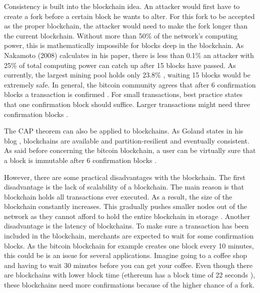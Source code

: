 
Consistency is built into the blockchain idea. An attacker would first have to create a fork before a certain block he wants to alter. For this fork to be accepted as the proper blockchain, the attacker would need to make the fork longer than the current blockchain. Without more than 50\% of the network's computing power, this is mathematically impossible for blocks deep in the blockchain. As Nakamoto (2008) calculates in his paper, there is less than 0.1\% an attacker with 25\% of total computing power can catch up after 15 blocks have passed. As currently, the largest mining pool holds only 23.8\% \cite{hashrate-distribution}, waiting 15 blocks would be extremely safe. In general, the bitcoin community agrees that after 6 confirmation blocks a transaction is confirmed \cite{bitcoin-confirmation-amount}. For small transactions, best practice states that one confirmation block should suffice. Larger transactions might need three confirmation blocks \cite{confirmation-safety}.


The CAP theorem can also be applied to blockchains. As Goland states in his blog \cite{blockchain-cap}, blockchains are available and partition-resilient and eventually consistent. As said before concerning the bitcoin blockchain, a user can be virtually sure that a block is immutable after 6 confirmation blocks \cite{bitcoin-confirmation-amount}.

However, there are some practical disadvantages with the blockchain. The first disadvantage is the lack of scalability of a blockchain. The main reason is that blockchain holds all transactions ever executed. As a result, the size of the blockchain constantly increases. This gradually pushes smaller nodes out of the network as they cannot afford to hold the entire blockchain in storage \cite{blockchain-scalability}. Another disadvantage is the latency of blockchains. To make sure a transaction has been included in the blockchain, merchants are expected to wait for some confirmation blocks. As the bitcoin blockchain for example creates one block every 10 minutes, this could be is an issue for several applications. Imagine going to a coffee shop and having to wait 30 minutes before you can get your coffee. Even though there are blockchains with lower block time (ethereum has a block time of 22 seconds \cite{ethereum-block-time}), these blockchains need more confirmations because of the higher chance of a fork.

